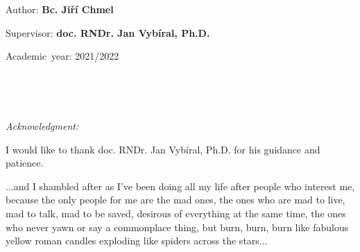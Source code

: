 \documentclass[11pt,oneside,czech,american]{book} %
\theoremstyle{definition} %
\theoremstyle{definition}
\newenvironment{lyxlist}[1]
{\begin{list}{}
		{\settowidth{\labelwidth}{#1}
			\setlength{\leftmargin}{\labelwidth}
			\addtolength{\leftmargin}{\labelsep}
			\renewcommand{\makelabel}[1]{##1\hfil}}}
	{\end{list}}
\begin{document}
\vfill{}

\begin{lyxlist}{MMMMMMMMM}
	\begin{singlespace}
		\item [{Author:}] \textbf{Bc. Jiří Chmel}
		\item [{Supervisor:}] \textbf{doc. RNDr. Jan Vybíral, Ph.D.}
	\end{singlespace}
	
	\begin{singlespace}
		\item [{Academic~year:}] 2021/2022
	\end{singlespace}
\end{lyxlist}
\newpage{}


~



%
%
%
%
%
%
%
%
%
%
~\newpage{}

\noindent \emph{\Large{}Acknowledgment:}{\Large \par}

\noindent I would like to thank doc. RNDr. Jan Vybíral, Ph.D.
for his guidance and patience.

\vfill%
\begin{fquote}...and I shambled after as I've been doing all my life after people who interest me, because the only people for me are the mad ones, the ones who are mad to live, mad to talk, mad to be saved, desirous of everything at the same time, the ones who never yawn or say a commonplace thing, but burn, burn, burn like fabulous yellow roman candles exploding like spiders across the stars...
\end{fquote}
\vfill
\end{document}
